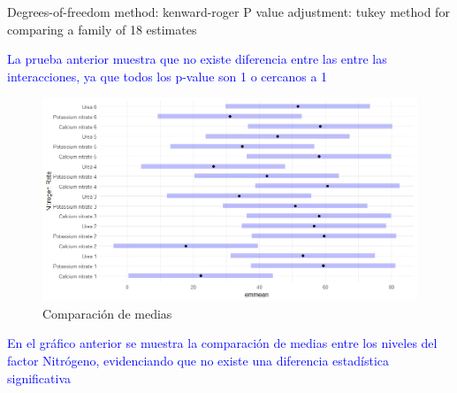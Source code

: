 \documentclass[a4paper,12pt]{article}
\begin{document}
\begin{enumerate}[label=\textbf{\alph*})]
\begin{MyVerbatim}
Degrees-of-freedom method: kenward-roger 
P value adjustment: tukey method for comparing a family of 18 estimates  
\end{MyVerbatim}
\textcolor{blue}{La prueba anterior muestra que no existe diferencia entre las entre las interacciones, ya que todos los p-value son 1 o cercanos a 1}
\begin{figure}[H]
	\centering
	\includegraphics[width=0.7\linewidth]{prob5_mediu}
	\caption[prob5_mediu]{Comparación de medias}
	\label{fig:prob5mediu}
\end{figure}

\textcolor{blue}{En el gráfico anterior se muestra la comparación de medias entre los niveles del factor Nitrógeno, evidenciando que no existe una diferencia estadística significativa}

	\end{enumerate}
\newpage
\end{document}
